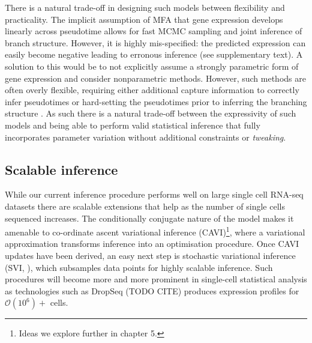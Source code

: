 There is a natural trade-off in designing such models between flexibility and practicality. The implicit assumption of MFA that gene expression develops linearly across pseudotime allows for fast MCMC sampling and joint inference of branch structure. However, it is highly mis-specified: the predicted expression can easily become negative leading to erronous inference (see supplementary text). A solution to this would be to not explicitly assume a strongly parametric form of gene expression and consider nonparametric methods. However, such methods are often overly flexible, requiring either additional capture information to correctly infer pseudotimes \cite{reid2016pseudotime} or hard-setting the pseudotimes prior to inferring the branching structure \cite{lonnberg2016temporal}. As such there is a natural trade-off between the expressivity of such models and being able to perform valid statistical inference that fully incorporates parameter variation without additional constraints or
 \emph{tweaking}.




\subsection{Scalable inference}

While our current inference procedure performs well on large single cell RNA-seq datasets there are scalable extensions that help as the number of single cells sequenced increases. The conditionally conjugate nature of the model makes it amenable to co-ordinate ascent variational inference (CAVI)\footnote{Ideas we explore further in chapter 5.}, where a variational approximation transforms inference into an optimisation procedure. Once CAVI updates have been derived, an easy next step is   stochastic variational inference (SVI, \cite{hoffman2013stochastic}), which subsamples data points for highly scalable inference. Such procedures will become more and more prominent in single-cell statistical analysis as technologies such as DropSeq (TODO CITE) produces expression profiles for $\mathcal{O}(10^6)+$ cells.




